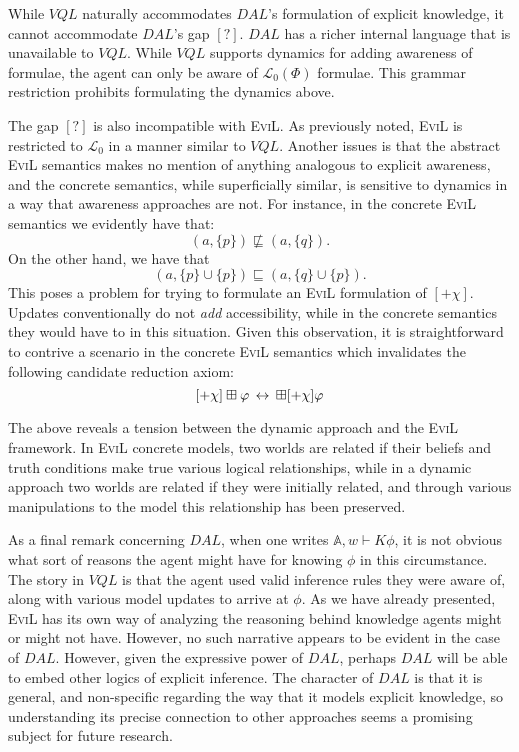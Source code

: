 While $VQL$ naturally accommodates $DAL$'s formulation of explicit
knowledge, it cannot accommodate $DAL$'s gap $[?]$.   $DAL$ has a
richer internal language that is unavailable to $VQL$.  While $VQL$ supports dynamics for adding awareness of
formulae, the agent can only be aware of $\mathcal{L}_0(\Phi)$
formulae.  This grammar restriction prohibits formulating the dynamics
above.

The gap $[?]$ is also incompatible with \textsc{EviL}.  As previously noted,
\textsc{EviL} is restricted to $\mathcal{L}_0$ in a manner similar to
$VQL$.  
Another 
issues is that the abstract \textsc{EviL} semantics makes no mention of 
anything analogous to explicit awareness, and the concrete semantics,
while superficially similar, is sensitive to dynamics in a way that
awareness approaches are not.  For instance, in the concrete
\textsc{EviL} semantics
we evidently have that:
$$(a,\{p\}) \not\sqsubseteq (a,\{q\}).$$  On the other hand, we have that
$$(a,\{p\}\cup \{p\}) \sqsubseteq (a,\{q\}\cup \{p\}).$$
This poses a problem for trying to formulate an \textsc{EviL}
formulation of $[+\chi]$.  Updates conventionally do not \emph{add}
accessibility, while in the concrete semantics they would have to in
this situation.  Given this observation, it is straightforward to
contrive a scenario in the concrete \textsc{EviL} semantics which
invalidates the following candidate reduction axiom:
\[ [+\chi] \boxplus \varphi \,\leftrightarrow\, \boxplus [+\chi] \varphi \]

The above reveals a tension between the dynamic approach and the
\textsc{EviL} framework.  In \textsc{EviL} concrete models, two worlds
are related if their beliefs and truth conditions make true various
logical relationships, while in a dynamic approach two worlds are related if
they were initially related, and through various manipulations to the model
this relationship has been preserved.

As a final remark concerning $DAL$, when one writes $\mathbb{A},w
\vdash K \phi$, it is not obvious what sort of reasons the agent might
have for knowing $\phi$ in this circumstance.  The story in $VQL$ is
that the agent used valid inference rules they were aware of, along
with various model updates to arrive at $\phi$.  As we have already
presented, \textsc{EviL} has its own way of analyzing the reasoning
behind knowledge agents might or might not have. However, no such
narrative appears to be evident in the case of $DAL$.  However, given
the expressive power of $DAL$, perhaps $DAL$ will be able to
embed other logics of explicit inference.  The character of $DAL$ is
that it is general, and non-specific regarding the way that it models
explicit knowledge, so understanding its precise connection to other
approaches seems a promising subject for future research.

